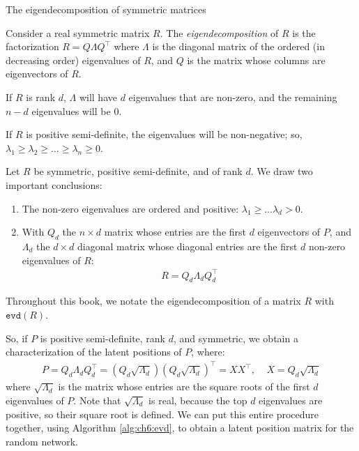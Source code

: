 \begin{floatingbox}[h]\caption{The eigendecomposition of symmetric matrices}
\label{box:ch6:evd_sum}
Consider a real symmetric matrix $R$. The \textit{eigendecomposition} of $R$ is the factorization $R = Q\Lambda Q^\top$ where $\Lambda$ is the diagonal matrix of the ordered (in decreasing order) eigenvalues of $R$, and $Q$ is the matrix whose columns are eigenvectors of $R$. 

If $R$ is rank $d$, $\Lambda$ will have $d$ eigenvalues that are non-zero, and the remaining $n - d$ eigenvalues will be $0$. 

If $R$ is positive semi-definite, the eigenvalues will be non-negative; so, $\lambda_1 \geq \lambda_2 \geq \hdots \geq \lambda_ n \geq 0$.

Let $R$ be symmetric, positive semi-definite, and of rank $d$. We draw two important conclusions:

\begin{enumerate}
    \item The non-zero eigenvalues are ordered and positive: $\lambda_1 \geq \hdots \lambda_d > 0$.
    \item With $Q_d$ the $n \times d$ matrix whose entries are the first $d$ eigenvectors of $P$, and $\Lambda_d$ the $d \times d$ diagonal matrix whose diagonal entries are the first $d$ non-zero eigenvalues of $R$:
\begin{align*}
R = Q_d \Lambda_d Q_d^\top
\end{align*}
\end{enumerate}
Throughout this book, we notate the eigendecomposition of a matrix $R$ with $\texttt{evd}(R)$.
\end{floatingbox}

So, if $P$ is positive semi-definite, rank $d$, and symmetric, we obtain a characterization of the latent positions of $P$, where:
\begin{align*}
    P = Q_d \Lambda_d Q_d^\top = (Q_d \sqrt{\Lambda_d})(Q_d \sqrt{\Lambda_d})^\top = XX^\top,\;\;\;\; X = Q_d \sqrt{\Lambda_d}
\end{align*}
where $\sqrt{\Lambda_d}$ is the matrix whose entries are the square roots of the first $d$ eigenvalues of $P$. Note that $\sqrt{\Lambda_d}$ is real, because the top $d$ eigenvalues are positive, so their square root is defined. We can put this entire procedure together, using Algorithm \ref{alg:ch6:evd}, to obtain a latent position matrix for the random network.

